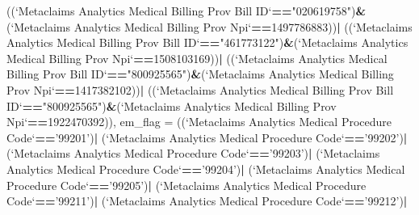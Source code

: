 \documentclass[]{article}
\newenvironment{Shaded}{\begin{snugshade}}{\end{snugshade}}
\newcommand{\DataTypeTok}[1]{\textcolor[rgb]{0.13,0.29,0.53}{#1}}
\newcommand{\DecValTok}[1]{\textcolor[rgb]{0.00,0.00,0.81}{#1}}
\newcommand{\StringTok}[1]{\textcolor[rgb]{0.31,0.60,0.02}{#1}}
\newcommand{\OperatorTok}[1]{\textcolor[rgb]{0.81,0.36,0.00}{\textbf{#1}}}
\newcommand{\NormalTok}[1]{#1}
\begin{document}
\begin{Shaded}
\begin{Highlighting}[]
{{\StringTok{           }\NormalTok{((}\StringTok{`}\DataTypeTok{Metaclaims Analytics Medical Billing Prov Bill ID}\StringTok{`}\OperatorTok{==}\StringTok{"020619758"}\NormalTok{)}\OperatorTok{&}\NormalTok{(}\StringTok{`}\DataTypeTok{Metaclaims Analytics Medical Billing Prov Npi}\StringTok{`}\OperatorTok{==}\DecValTok{1497786883}\NormalTok{))}\OperatorTok{|}
\StringTok{           }\NormalTok{((}\StringTok{`}\DataTypeTok{Metaclaims Analytics Medical Billing Prov Bill ID}\StringTok{`}\OperatorTok{==}\StringTok{"461773122"}\NormalTok{)}\OperatorTok{&}\NormalTok{(}\StringTok{`}\DataTypeTok{Metaclaims Analytics Medical Billing Prov Npi}\StringTok{`}\OperatorTok{==}\DecValTok{1508103169}\NormalTok{))}\OperatorTok{|}
\StringTok{           }\NormalTok{((}\StringTok{`}\DataTypeTok{Metaclaims Analytics Medical Billing Prov Bill ID}\StringTok{`}\OperatorTok{==}\StringTok{"800925565"}\NormalTok{)}\OperatorTok{&}\NormalTok{(}\StringTok{`}\DataTypeTok{Metaclaims Analytics Medical Billing Prov Npi}\StringTok{`}\OperatorTok{==}\DecValTok{1417382102}\NormalTok{))}\OperatorTok{|}
\StringTok{           }\NormalTok{((}\StringTok{`}\DataTypeTok{Metaclaims Analytics Medical Billing Prov Bill ID}\StringTok{`}\OperatorTok{==}\StringTok{"800925565"}\NormalTok{)}\OperatorTok{&}\NormalTok{(}\StringTok{`}\DataTypeTok{Metaclaims Analytics Medical Billing Prov Npi}\StringTok{`}\OperatorTok{==}\DecValTok{1922470392}\NormalTok{)),}
         \DataTypeTok{em_flag =}\NormalTok{ ((}\StringTok{`}\DataTypeTok{Metaclaims Analytics Medical Procedure Code}\StringTok{`}\OperatorTok{==}\StringTok{'99201'}\NormalTok{)}\OperatorTok{|}
\StringTok{                      }\NormalTok{(}\StringTok{`}\DataTypeTok{Metaclaims Analytics Medical Procedure Code}\StringTok{`}\OperatorTok{==}\StringTok{'99202'}\NormalTok{)}\OperatorTok{|}
\StringTok{                      }\NormalTok{(}\StringTok{`}\DataTypeTok{Metaclaims Analytics Medical Procedure Code}\StringTok{`}\OperatorTok{==}\StringTok{'99203'}\NormalTok{)}\OperatorTok{|}
\StringTok{                      }\NormalTok{(}\StringTok{`}\DataTypeTok{Metaclaims Analytics Medical Procedure Code}\StringTok{`}\OperatorTok{==}\StringTok{'99204'}\NormalTok{)}\OperatorTok{|}
\StringTok{                      }\NormalTok{(}\StringTok{`}\DataTypeTok{Metaclaims Analytics Medical Procedure Code}\StringTok{`}\OperatorTok{==}\StringTok{'99205'}\NormalTok{)}\OperatorTok{|}
\StringTok{                      }\NormalTok{(}\StringTok{`}\DataTypeTok{Metaclaims Analytics Medical Procedure Code}\StringTok{`}\OperatorTok{==}\StringTok{'99211'}\NormalTok{)}\OperatorTok{|}
\StringTok{                      }\NormalTok{(}\StringTok{`}\DataTypeTok{Metaclaims Analytics Medical Procedure Code}\StringTok{`}\OperatorTok{==}\StringTok{'99212'}\NormalTok{)}\OperatorTok{|}
}}
\end{Highlighting}
\end{Shaded}
\end{document}

